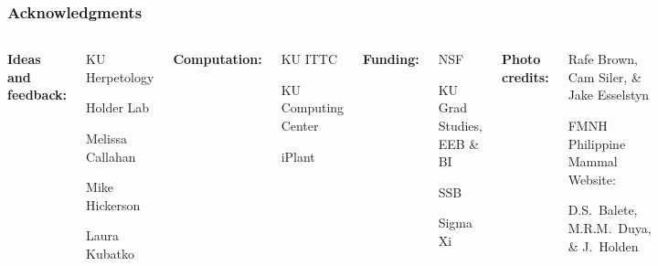 \begin{frame}
    \frametitle{Acknowledgments}
    \begin{columns}[c]
            {\bf Ideas and feedback:}
            \begin{myitemize}
                \item KU Herpetology
                \item Holder Lab
                \item Melissa Callahan
                \item Mike Hickerson
                \item Laura Kubatko
            \end{myitemize}
            \smallskip
            {\bf Computation:}
            \begin{myitemize}
                \item KU ITTC
                \item KU Computing Center
                \item iPlant
            \end{myitemize}
            {\bf Funding:}
            \begin{myitemize}
                \item NSF
                \item KU Grad Studies, EEB \& BI
                \item SSB
                \item Sigma Xi
            \end{myitemize}
            \smallskip
            {\bf Photo credits:}
            \begin{myitemize}
                \item Rafe Brown, Cam Siler, \& Jake Esselstyn
                \item FMNH Philippine Mammal Website:
                    \begin{myitemize}
                        \item D.S.\ Balete, M.R.M.\ Duya, \& J.\ Holden
                    \end{myitemize}
            \end{myitemize}
    \end{columns}
\end{frame}

